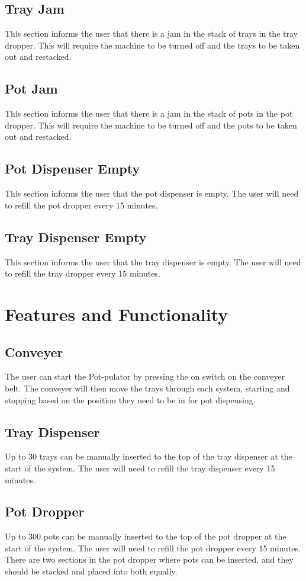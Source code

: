 \documentclass{article}
\begin{document}
\subsection{Tray Jam}
This section informs the user that there is a jam in the stack of trays in the tray dropper. This will require the machine to be turned off and the trays to be taken out and restacked. 
\subsection{Pot Jam}
This section informs the user that there is a jam in the stack of pots in the pot dropper. This will require the machine to be turned off and the pots to be taken out and restacked. 
\subsection{Pot Dispenser Empty}
This section informs the user that the pot dispenser is empty. The user will need to refill the pot dropper every 15 minutes.
\subsection{Tray Dispenser Empty}
This section informs the user that the tray dispenser is empty. The user will need to refill the tray dropper every 15 minutes.
\section{Features and Functionality}
\subsection{Conveyer}
The user can start the Pot-pulator by pressing the on switch on the conveyer belt. The conveyer will then move the trays through each system, starting and stopping based on the position they need to be in for pot dispensing. 
\subsection{Tray Dispenser}
Up to 30 trays can be manually inserted to the top of the tray dispenser at the start of the system. The user will need to refill the tray dispenser every 15 minutes.
\subsection{Pot Dropper}
Up to 300 pots can be manually inserted to the top of the pot dropper at the start of the system. The user will need to refill the pot dropper every 15 minutes. There are two sections in the pot dropper where pots can be inserted, and they should be stacked and placed into both equally.
\end{document}
